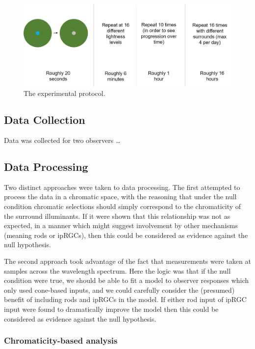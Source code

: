 \begin{figure}[htbp]
\includegraphics[max width=\textwidth]{figs/LargeSphere/ExperimentalPro.png}
\caption{The experimental protocol.}
\label{fig:ExperimentalPro}
\end{figure}

\subsection{Data Collection}

Data was collected for two observers \dots

\subsection{Data Processing}

Two distinct approaches were taken to data processing. The first attempted to process the data in a chromatic space, with the reasoning that under the null condition chromatic selections should simply correspond to the chromaticity of the surround illuminants. If it were shown that this relationship was not as expected, in a manner which might suggest involvement by other mechanisms (meaning rods or \glspl{ipRGC}), then this could be considered as evidence against the null hypothesis.

The second approach took advantage of the fact that measurements were taken at samples across the wavelength spectrum. Here the logic was that if the null condition were true, we should be able to fit a model to observer responses which only used cone-based inputs, and we could carefully consider the (presumed) benefit of including rods and \glspl{ipRGC} in the model. If either rod input of \gls{ipRGC} input were found to dramatically improve the model then this could be considered as evidence against the null hypothesis.

\subsubsection{Chromaticity-based analysis}

